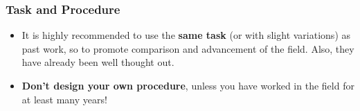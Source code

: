 \documentclass{beamer}
\begin{document}
\begin{frame}
	\frametitle{Task and Procedure}
	\begin{itemize}
		\item It is highly recommended to use the \textbf{same task} (or with slight variations) as past work, so to promote comparison and advancement of the field.  Also, they have already been well thought out.
		\item \textbf{Don't design your own procedure}, unless you have worked in the field for at least many years!
	\end{itemize}
\end{frame}
\end{document}
